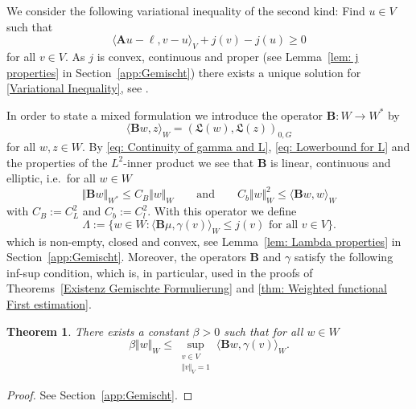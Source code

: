 \documentclass[12pt,twoside,reqno]{amsart}
\newtheorem{theorem}{Theorem}[section]
\theoremstyle{definition}
\numberwithin{equation}{section}
\renewcommand{\L}{\mathfrak{L}}
\newcommand{\B} {\bm{B}}
\newcommand{\norm}[1]    {\Vert #1 \Vert}
\begin{document}
    We consider the following variational inequality of the second kind: Find $u\in V$ such that
    \begin{equation}\label{Variational Inequality}
        \langle \bm{A}u-\bm{\ell},v-u\rangle_V +j(v)-j(u) \geq 0
    \end{equation}
    for all $v\in V$. As $j$ is convex, continuous and proper (see Lemma~\ref{lem: j properties} in Section~\ref{app:Gemischt})
    there exists a unique solution for \eqref{Variational Inequality}, see \cite[Thm.~4.1]{Glowinski1984}.
    
     In order to state a mixed formulation we introduce the operator $\B:W\to W^*$ by
    \begin{equation}\label{eq: Definition of B}
        \langle \B w, z\rangle_W=(\L(w),\L(z))_{0,G}
    \end{equation}
    for all $w,z\in W$.  By \eqref{eq: Continuity of gamma and L}, \eqref{eq: Lowerbound for L} and the properties of the $L^2$-inner product we see that $\B$ is linear, continuous and elliptic, i.e.~for all $w\in W$
    \begin{equation}\label{eq: B cont and ell}
        \norm{\B w}_{W^*}\leq C_B\norm{w}_W \qquad \text{and} \qquad C_b\norm{w}_W^2\leq \langle \B w, w\rangle_W
    \end{equation}
    with $C_B:=C_L^2$ and $C_b:=C_l^2$. With this operator we define
    \begin{equation} \label{eq:DefLambda}
        \Lambda:=\{w\in W: \langle \B \mu, \gamma(v)\rangle_W\leq j(v) \text{ for all } v\in V\}.
    \end{equation}
     which is non-empty, closed and convex, see Lemma~\ref{lem: Lambda properties} in Section~\ref{app:Gemischt}.
    Moreover, the operators $\B$ and $\gamma$ satisfy the following inf-sup condition, which is, in particular, used in the proofs of Theorems~\ref{Existenz Gemischte Formulierung} and  \ref{thm: Weighted functional First estimation}.
    
\begin{theorem}\label{thm:inf-sup}
    \emph{There exists a constant $\beta>0$ such that for all $w\in W$}
        \begin{equation}\label{lem:dense subset norm estimation}
            \beta\norm{w}_W\leq \sup\limits_{\substack{v\in V \\ \norm{v}_V=1}}\langle \B w ,\gamma(v)\rangle_W .
        \end{equation}

\end{theorem}
    \begin{proof}
     See Section~\ref{app:Gemischt}.
    \end{proof}
    
\end{document}
